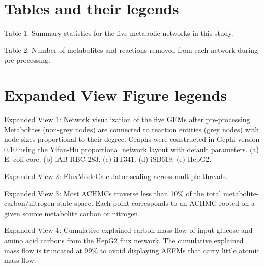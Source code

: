 \documentclass[12pt]{article}
\begin{document}
\section*{Tables and their legends}

\noindent Table 1: Summary statistics for the five metabolic networks in
this study.

\noindent Table 2: Number of metabolites and reactions removed from each
network during pre-processing.

\section*{Expanded View Figure legends}

\noindent Expanded View 1: Network visualization of the five GEMs after
pre-processing. Metabolites (non-grey nodes) are connected to reaction
entities (grey nodes) with node sizes proportional to their degree. Graphs
were constructed in Gephi version 0.10 using the Yifan-Hu proportional
network layout with default parameters. (a) E. coli core. (b) iAB RBC 283.
(c) iIT341. (d) iSB619. (e) HepG2.

\noindent Expanded View 2: FluxModeCalculator scaling across multiple
threads.

\noindent Expanded View 3: Most ACHMCs traverse less than 10\% of the
total metabolite-carbon/nitrogen state space. Each point corresponds to an
ACHMC rooted on a given source metabolite carbon or nitrogen.

\noindent Expanded View 4: Cumulative explained carbon mass flow of input
glucose and amino acid carbons from the HepG2 flux network. The cumulative
explained mass flow is truncated at 99\% to avoid displaying AEFMs that
carry little atomic mass flow.
\end{document}
